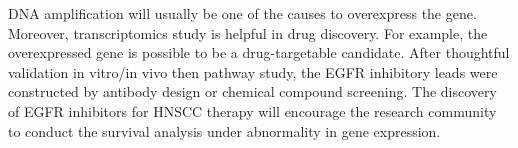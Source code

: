 \documentclass[preprint,12pt]{elsarticle}
\newenvironment{MyColorPar}[1]{%
    \leavevmode\color{#1}\ignorespaces%
}{%
}%
\begin{document}
\begin{MyColorPar}{blue}
DNA amplification will usually be one of the causes to overexpress the gene.
Moreover, transcriptomics study is helpful in drug discovery. For example, the overexpressed gene is possible to be a drug-targetable candidate\cite{Park2015}. After thoughtful validation in vitro/in vivo then pathway study, the EGFR inhibitory leads were constructed by antibody design or chemical compound screening\cite{Mahajan2016}. %
The discovery of EGFR inhibitors\cite{Bonner2006a} for HNSCC therapy will encourage the research community to conduct the survival analysis under abnormality in gene expression.


\end{MyColorPar}
\end{document}
